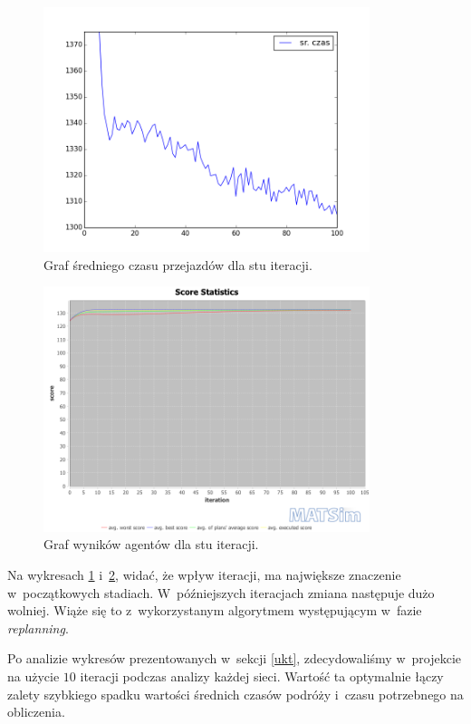 \documentclass[twoside,12pt]{report}
\begin{document}
\begin{figure}[ht]
\centering
\includegraphics[width=0.85\textwidth]{img/def_iters}
\caption{Graf średniego czasu przejazdów dla stu iteracji.}
\label{def_iters}
\end{figure}

\begin{figure}[ht]
\centering
\includegraphics[width=0.85\textwidth]{img/def_scorestats}
\caption{Graf wyników agentów dla stu iteracji.}
\label{def_scorestats}
\end{figure}

Na wykresach \ref{def_iters} i~\ref{def_scorestats}, widać, że wpływ iteracji, ma największe znaczenie w~początkowych stadiach. W~późniejszych iteracjach zmiana następuje dużo wolniej. Wiąże się to z~wykorzystanym algorytmem występującym w~fazie \textit{replanning}. 

Po analizie wykresów prezentowanych w~sekcji \ref{ukt}, zdecydowaliśmy w~projekcie na użycie $10$ iteracji podczas analizy każdej sieci. Wartość ta optymalnie łączy zalety szybkiego spadku wartości średnich czasów podróży i~czasu potrzebnego na obliczenia.
\end{document}
